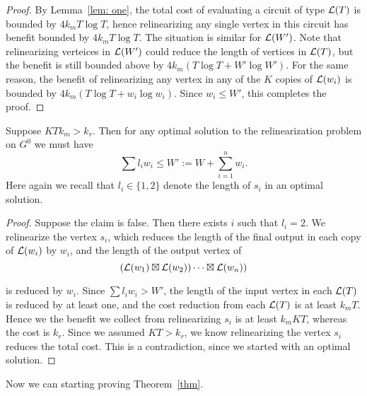 \documentclass[11pt]{article} %
\theoremstyle{plain}
\theoremstyle{definition}
\begin{document}
\begin{proof}
By Lemma~\ref{lem: one},  the total cost of evaluating a circuit of type $\mathcal{L}(T)$ is bounded by $4 k_m T\log T$, hence relinearizing any single vertex in this circuit has benefit bounded by $4k_m T\log T$. The situation is similar for $\mathcal{L}(W')$. Note that relinearizing verteices in $\mathcal{L}(W')$ 
could reduce the length of vertices in $\mathcal{L}(T)$, but the benefit is still bounded above by $4k_m(T\log T + W'\log W')$. For the same reason, the benefit of relinearizing any vertex in any of the $K$ copies of $\mathcal{L}(w_i)$ is bounded by $4k_m(T\log T + w_i \log w_i)$. Since $w_i \leq W'$, this completes
the proof.
\end{proof}


\begin{lemma} \label{lem: constraint}
Suppose $KT k_m > k_r$.  Then for any optimal solution to the relinearization problem on $G^0$ we must have 
\[
	\sum l_i w_i \leq  W':= W + \sum_{i =1}^n w_i. 
\]
Here again we recall that $l_i \in \{1, 2 \}$ denote the length of $s_i$ in an optimal solution. 
\end{lemma}



\begin{proof}
Suppose the claim is false. Then there exists $i$ such that $l_i = 2$. We relinearize the vertex $s_i$, which reduces the length of the final output in each  copy of $\mathcal{L}(w_i)$ by $w_i$, and the length of the output vertex of
$$
(\mathcal{L}(w_1) \boxtimes \mathcal{L}(w_2)) \cdots \boxtimes \mathcal{L}(w_n))$$

is reduced by $w_i$. Since $\sum l_i w_i > W'$, the length of the input vertex in each $\mathcal{L}(T)$ is reduced by at least one, and the cost reduction from each $\mathcal{L}(T)$ is at least $k_m T$. Hence we the benefit 
we collect from relinearizing $s_i$ is at least $k_m KT$, whereas the cost is $k_r$. Since we assumed $KT > k_r$, we know relinearizing the vertex $s_i$ reduces  the total cost. This is a contradiction, since we started with an optimal solution. 
\end{proof}


Now we can starting proving Theorem~\ref{thm}. 
\end{document}
